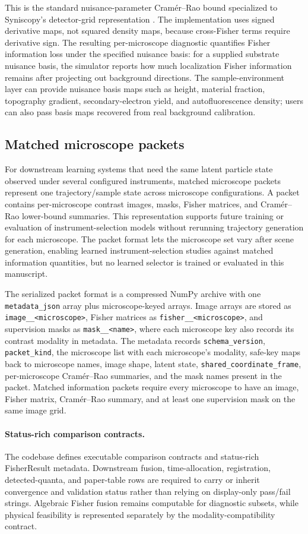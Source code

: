 This is the standard nuisance-parameter Cram\'{e}r--Rao bound specialized to Syniscopy's detector-grid representation \cite{fisher-tutorial,ober-ram-ward,fisher-fusion}. The implementation uses signed derivative maps, not squared density maps, because cross-Fisher terms require derivative sign. The resulting per-microscope diagnostic quantifies Fisher information loss under the specified nuisance basis: for a supplied substrate nuisance basis, the simulator reports how much localization Fisher information remains after projecting out background directions. The sample-environment layer can provide nuisance basis maps such as height, material fraction, topography gradient, secondary-electron yield, and autofluorescence density; users can also pass basis maps recovered from real background calibration.

\subsection{Matched microscope packets}

For downstream learning systems that need the same latent particle state observed under several configured instruments, matched microscope packets represent one trajectory/sample state across microscope configurations. A packet contains per-microscope contrast images, masks, Fisher matrices, and Cram\'{e}r--Rao lower-bound summaries. This representation supports future training or evaluation of instrument-selection models without rerunning trajectory generation for each microscope. The packet format lets the microscope set vary after scene generation, enabling learned instrument-selection studies against matched information quantities, but no learned selector is trained or evaluated in this manuscript.

The serialized packet format is a compressed NumPy archive with one \texttt{metadata\_json} array plus microscope-keyed arrays. Image arrays are stored as \texttt{image\_\_<microscope>}, Fisher matrices as \texttt{fisher\_\_<microscope>}, and supervision masks as \texttt{mask\_\_<name>}, where each microscope key also records its contrast modality in metadata. The metadata records \texttt{schema\_version}, \texttt{packet\_kind}, the microscope list with each microscope's modality, safe-key maps back to microscope names, image shape, latent state, \texttt{shared\_coordinate\_frame}, per-microscope Cram\'{e}r--Rao summaries, and the mask names present in the packet. Matched information packets require every microscope to have an image, Fisher matrix, Cram\'{e}r--Rao summary, and at least one supervision mask on the same image grid.


\paragraph{Status-rich comparison contracts.} The codebase defines executable comparison contracts and status-rich FisherResult metadata. Downstream fusion, time-allocation, registration, detected-quanta, and paper-table rows are required to carry or inherit convergence and validation status rather than relying on display-only pass/fail strings. Algebraic Fisher fusion remains computable for diagnostic subsets, while physical feasibility is represented separately by the modality-compatibility contract.
